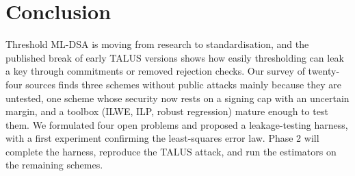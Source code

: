 \documentclass[10pt,conference,a4paper]{IEEEtran}
\begin{document}
\section{Conclusion}
Threshold ML-DSA is moving from research to standardisation, and the published break of early TALUS versions shows how
easily thresholding can leak a key through commitments or removed rejection checks. Our survey of twenty-four sources
finds three schemes without public attacks mainly because they are untested, one scheme whose security now rests on a
signing cap with an uncertain margin, and a toolbox (ILWE, ILP, robust regression) mature enough to test them. We
formulated four open problems and proposed a leakage-testing harness, with a first experiment confirming the
least-squares error law. Phase 2 will complete the harness, reproduce the TALUS attack, and run the estimators on the
remaining schemes.
\end{document}
